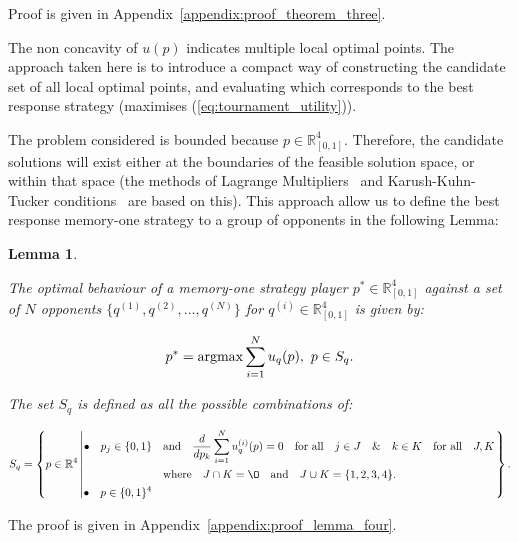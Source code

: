 \documentclass[10pt]{article}
\newcommand{\R}{\mathbb{R}}
\newtheorem{lemma}[theorem]{Lemma}
\begin{document}
Proof is given in Appendix~\ref{appendix:proof_theorem_three}.

The non concavity of \(u(p)\) indicates multiple local optimal points. The
approach taken here is to introduce a compact way of constructing the candidate
set of all local optimal points, and evaluating which corresponds to the best response
strategy (maximises (\ref{eq:tournament_utility})).

The problem considered is bounded because \(p \in \R^4_{[0, 1]}\).
Therefore, the candidate solutions will exist either at the boundaries of the
feasible solution space, or within that space (the methods of Lagrange
Multipliers~\cite{bertsekas2014} and Karush-Kuhn-Tucker
conditions~\cite{Giorgi2016} are based on this). This approach allow us to
define the best response memory-one strategy to a group of opponents in the
following Lemma:

\begin{lemma}\label{lemma:memone_group_best_response}

    The optimal behaviour of a memory-one strategy player
    \(p^* \in \R_{[0, 1]} ^ 4\)
    against a set of \(N\) opponents \(\{q^{(1)}, q^{(2)}, \dots, q^{(N)} \}\)
    for \(q^{(i)} \in \R_{[0, 1]} ^ 4\) is given by:

    \[p^* = \textnormal{argmax}\sum\limits_{i=1} ^ N  u_q(p), \ p \in S_q.\]

    The set \(S_q\) is defined as all the possible combinations of:

    \begin{equation}\label{eq:s_q_set}
        S_q =
        \left\{p \in \mathbb{R} ^ 4 \left|
            \begin{aligned}
                \bullet\quad p_j \in \{0, 1\} & \quad \text{and} \quad \frac{d}{dp_k} 
                \sum\limits_{i=1} ^ N  u_q^{(i)}(p) = 0
                \quad \text{for all} \quad j \in J \quad \&  \quad k \in K  \quad \text{for all} \quad J, K \\
                & \quad \text{where} \quad J \cap K = \O \quad
                \text{and} \quad J \cup K = \{1, 2, 3, 4\}.\\
                \bullet\quad  p \in \{0, 1\} ^ 4
            \end{aligned}\right.
        \right\}.
    \end{equation}
\end{lemma}

The proof is given in Appendix~\ref{appendix:proof_lemma_four}.
\end{document}
